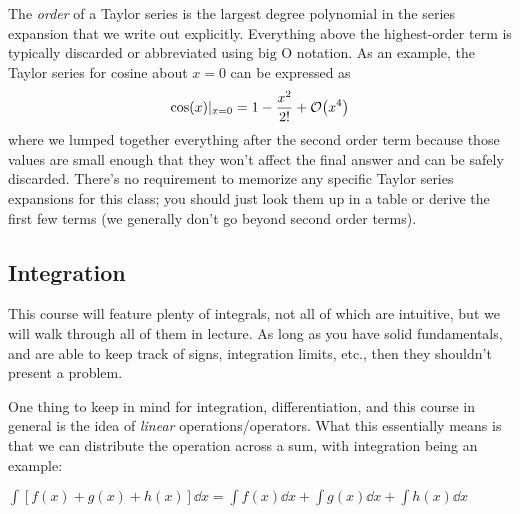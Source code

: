 The \emph{order} of a Taylor series is the largest degree polynomial in the series expansion that we write out explicitly. Everything above the highest-order term is typically discarded or abbreviated using $\text{big O}$ notation. As an example, the Taylor series for cosine about $x=0$ can be expressed as \[ \cos(x)|_{x=0} = 1 - \dfrac{x^2}{2!} + \order{x^4} \] where we lumped together everything after the second order term because those values are small enough that they won't affect the final answer and can be safely discarded. There's no requirement to memorize any specific Taylor series expansions for this class; you should just look them up in a table or derive the first few terms (we generally don't go beyond second order terms).


\subsection{Integration}
This course will feature plenty of integrals, not all of which are intuitive, but we will walk through all of them in lecture. As long as you have solid fundamentals, and are able to keep track of signs, integration limits, etc., then they shouldn't present a problem. \par 

One thing to keep in mind for integration, differentiation, and this course in general is the idea of \emph{linear} operations/operators. What this essentially means is that we can distribute the operation across a sum, with integration being an example:
\begin{tcolorbox}[title=Linear operations---integration example]
	$\displaystyle\int \left[ f(x) + g(x) + h(x) \right]\dd{x} = \displaystyle\int f(x)\dd{x} + \displaystyle\int g(x)\dd{x} + \displaystyle\int h(x)\dd{x}$
\end{tcolorbox}


